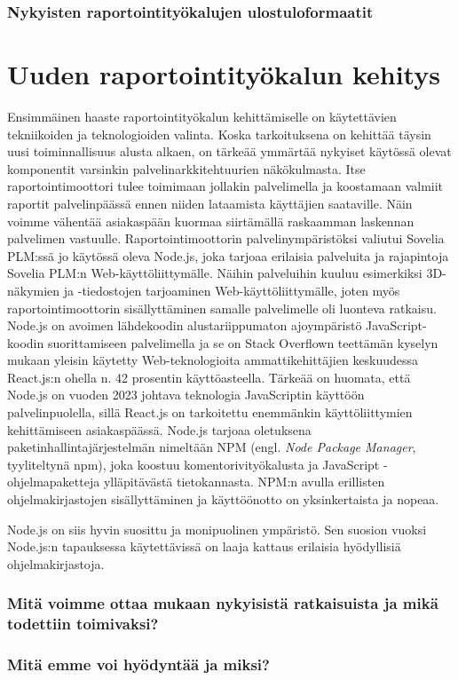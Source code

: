\subsubsection{Nykyisten raportointityökalujen ulostuloformaatit}

\section{Uuden raportointityökalun kehitys}

Ensimmäinen haaste raportointityökalun kehittämiselle on käytettävien tekniikoiden ja teknologioiden valinta. Koska tarkoituksena on kehittää täysin uusi toiminnallisuus alusta alkaen, on tärkeää ymmärtää nykyiset käytössä olevat komponentit varsinkin palvelinarkkitehtuurien näkökulmasta. Itse raportointimoottori tulee toimimaan jollakin palvelimella ja koostamaan valmiit raportit palvelinpäässä ennen niiden lataamista käyttäjien saataville. Näin voimme vähentää asiakaspään kuormaa siirtämällä raskaamman laskennan palvelimen vastuulle. Raportointimoottorin palvelinympäristöksi valiutui Sovelia PLM:ssä jo käytössä oleva Node.js, joka tarjoaa erilaisia palveluita ja rajapintoja Sovelia PLM:n Web-käyttöliittymälle. Näihin palveluihin kuuluu esimerkiksi 3D-näkymien ja -tiedostojen tarjoaminen Web-käyttöliittymälle, joten myös raportointimoottorin sisällyttäminen samalle palvelimelle oli luonteva ratkaisu. Node.js on avoimen lähdekoodin alustariippumaton ajoympäristö JavaScript-koodin suorittamiseen palvelimella ja se on Stack Overflown teettämän kyselyn mukaan yleisin käytetty Web-teknologioita ammattikehittäjien keskuudessa React.js:n ohella n. 42 prosentin käyttöasteella. \cite{stackoverflowStackOverflow} Tärkeää on huomata, että Node.js on vuoden 2023 johtava teknologia JavaScriptin käyttöön palvelinpuolella, sillä React.js on tarkoitettu enemmänkin käyttöliittymien kehittämiseen asiakaspäässä. Node.js tarjoaa oletuksena paketinhallintajärjestelmän nimeltään NPM (engl. \textit{Node Package Manager}, tyyliteltynä npm), joka koostuu komentorivityökalusta ja JavaScript -ohjelmapaketteja ylläpitävästä tietokannasta. NPM:n avulla erillisten ohjelmakirjastojen sisällyttäminen ja käyttöönotto on yksinkertaista ja nopeaa. \cite{npmjsAbout}

Node.js on siis hyvin suosittu ja monipuolinen ympäristö. Sen suosion vuoksi Node.js:n tapauksessa käytettävissä on laaja kattaus erilaisia hyödyllisiä ohjelmakirjastoja.

\subsubsection{Mitä voimme ottaa mukaan nykyisistä ratkaisuista ja mikä todettiin toimivaksi?}

\subsubsection{Mitä emme voi hyödyntää ja miksi?}
